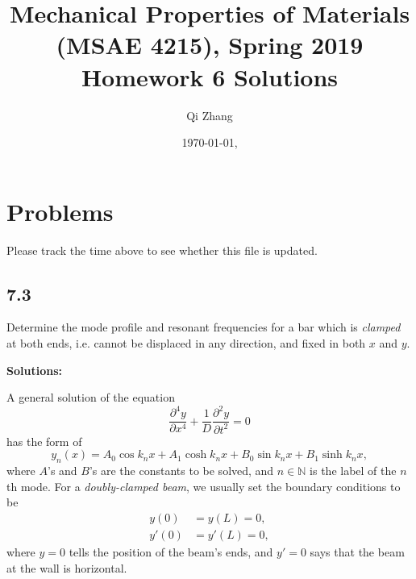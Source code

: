 \documentclass[12pt]{article}
\begin{document}

\title{Mechanical Properties of Materials (MSAE 4215), Spring 2019\\ Homework 6 Solutions}
\author{Qi Zhang}
\date{\today, \currenttime}

\maketitle

\tableofcontents
\listoffigures

\section{Problems}
Please track the time above to see whether this file is updated.

\subsection{7.3}
Determine the mode profile and resonant frequencies for a bar which is \textit{clamped}
at both ends, i.e. cannot be displaced in any direction, and fixed in both $x$ and $y$.

\textbf{Solutions:}

A general solution of the equation
\begin{equation}
  \frac{ \partial^4 y }{ \partial x^4 } + \frac{ 1 }{ D } \frac{ \partial^2 y }{ \partial t^2 } = 0
\end{equation}
has the form of
\begin{equation}
  y_n(x) = A_0 \cos k_n x + A_1 \cosh k_n x + B_0 \sin k_n x + B_1 \sinh k_n x,
\end{equation}
where $A$'s and $B$'s are the constants to be solved, and $n \in \mathbb{N}$ is
the label of the $n$th mode.
For a \emph{doubly-clamped beam}, we usually set the boundary conditions to be
\begin{align}
  y(0)  & = y(L) = 0,  \\
  y'(0) & = y'(L) = 0,
\end{align}
where $y = 0$ tells the position of the beam's ends,
and $y' = 0$ says that the beam at the wall is horizontal.
\end{document}
